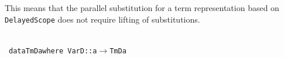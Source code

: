 \documentclass[9pt,preprint,authoryear]{sigplanconf}
\begin{document}
%
This means that the parallel substitution for a term representation 
    based on \textcolor[rgb]{0,0,0.80}{\texttt{DelayedScope}} does not require lifting of substitutions.%


{\nopagebreak }

%
%
%
~\\~\vphantom{$\{$}\textcolor[cmyk]{0,0.65,0.99,0}{\texttt{data}}\textcolor[rgb]{0,0,0.80}{\texttt{\mbox{\hspace{0.50em}}}}\textcolor[rgb]{0,0,0.80}{\texttt{TmD}}\textcolor[rgb]{0,0,0.80}{\texttt{\mbox{\hspace{0.50em}}}}\textcolor[rgb]{0,0,0.80}{\texttt{a}}\textcolor[rgb]{0,0,0.80}{\texttt{\mbox{\hspace{0.50em}}}}\textcolor[cmyk]{0,0.65,0.99,0}{\texttt{where}}\textcolor[rgb]{0,0,0.80}{\texttt{{\nopagebreak \newline%
}\vphantom{$\{$}}}\textcolor[rgb]{0,0,0.80}{\texttt{\mbox{\hspace{0.50em}}}}\textcolor[rgb]{0,0,0.80}{\texttt{\mbox{\hspace{0.50em}}}}\textcolor[rgb]{0.70,0.13,0.13}{\texttt{VarD}}\textcolor[rgb]{0,0,0.80}{\texttt{\mbox{\hspace{0.50em}}}}\textcolor[cmyk]{0,0.65,0.99,0}{\texttt{{:}{:}}}\textcolor[rgb]{0,0,0.80}{\texttt{\mbox{\hspace{0.50em}}}}\textcolor[rgb]{0,0,0.80}{\texttt{a}}\textcolor[rgb]{0,0,0.80}{\texttt{\mbox{\hspace{0.50em}}}}\textcolor[cmyk]{0,0.65,0.99,0}{\texttt{$ \rightarrow $}}\textcolor[rgb]{0,0,0.80}{\texttt{\mbox{\hspace{0.50em}}}}\textcolor[rgb]{0,0,0.80}{\texttt{TmD}}\textcolor[rgb]{0,0,0.80}{\texttt{\mbox{\hspace{0.50em}}}}\textcolor[rgb]{0,0,0.80}{\texttt{a}}\textcolor[rgb]{0,0,0.80}{\texttt{{\nopagebreak \newline%
}}}
\end{document}
